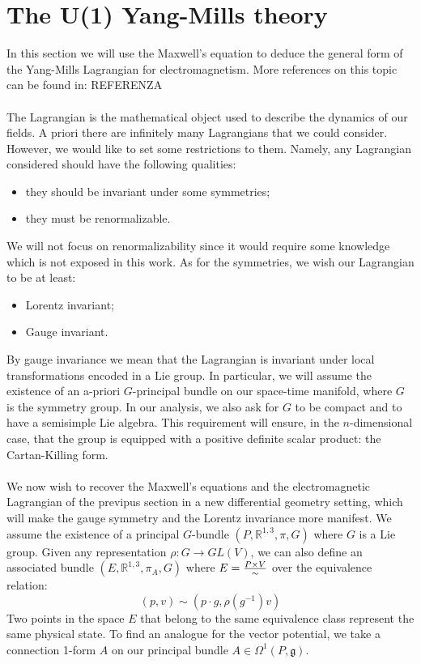 \documentclass[12pt,a4paper]{report}
\theoremstyle{definition}
\theoremstyle{Theorem}
\theoremstyle{definition}
\theoremstyle{definition}
\begin{document}
	\section{The U(1) Yang-Mills theory}
	In this section we will use the Maxwell's equation to deduce the general form of the Yang-Mills Lagrangian for electromagnetism. More references on this topic can be found in: REFERENZA
	\\\\
	The Lagrangian is the mathematical object used to describe the dynamics of our fields. A priori there are infinitely many Lagrangians that we could consider. However, we would like to set some restrictions to them. Namely, any Lagrangian considered should have the following qualities:
	\begin{itemize}
		\item they should be invariant under some symmetries;
		\item they must be renormalizable.
	\end{itemize}
	We will not focus on renormalizability since it would require some knowledge which is not exposed in this work. As for the symmetries, we wish our Lagrangian to be at least:
	\begin{itemize}
		\item Lorentz invariant;
		\item Gauge invariant.
	\end{itemize}
	By gauge invariance we mean that the Lagrangian is invariant under local transformations encoded in a Lie group. In particular, we will assume the existence of an a-priori $G$-principal bundle on our space-time manifold, where $G$ is the symmetry group. In our analysis, we also ask for $G$ to be compact and to have a semisimple Lie algebra. This requirement will ensure, in the $n$-dimensional case, that the group is equipped with a positive definite scalar product: the Cartan-Killing form.
	\\\\
	We now wish to recover the Maxwell's equations and the electromagnetic Lagrangian of the previpus section in a new differential geometry setting, which will make the gauge symmetry and the Lorentz invariance more manifest. We assume the existence of a principal $G$-bundle $(P,\mathbb{R}^{1,3},\pi,G)$ where $G$ is a Lie group. Given any representation $\rho:G\rightarrow GL(V)$, we can also define an associated bundle $(E,\mathbb{R}^{1,3},\pi_A,G)$ where $E={P\times V\over \sim}$ over the equivalence relation:
	$$(p,v)\sim(p\cdot g,\rho(g^{-1})v)$$
	Two points in the space $E$ that belong to the same equivalence class represent the same  physical state. To find an analogue for the vector potential, we take a connection 1-form $A$ on our principal bundle $A\in\Omega^1(P,\mathfrak{g})$.\\
\end{document}

